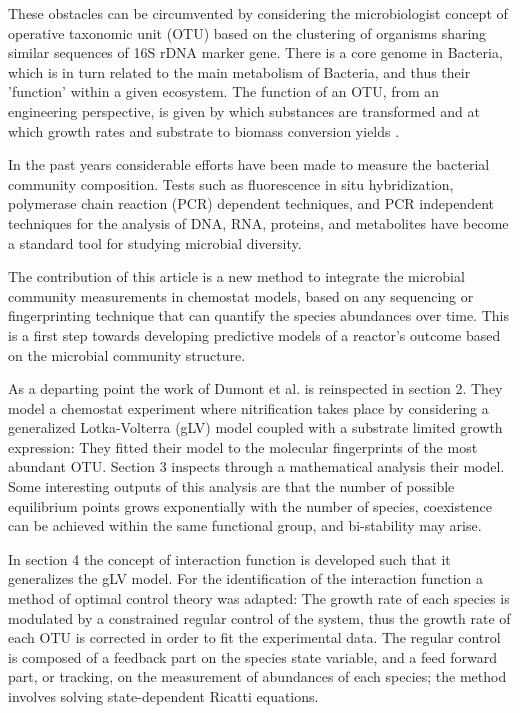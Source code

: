 \documentclass[3p,times]{article}
\begin{document}
These obstacles can be circumvented by considering the microbiologist concept of operative taxonomic unit (OTU) based on the clustering of organisms sharing similar sequences of 16S rDNA marker gene. There is a core genome in Bacteria, which is in turn related to the main metabolism of Bacteria, and thus their 'function' within a given ecosystem. The function of an OTU, from an engineering perspective, is given by which substances are transformed and at which growth rates and substrate to biomass conversion yields \cite{Muyzer1993}.

In the past years considerable efforts have been made to measure the bacterial community composition. Tests such as fluorescence in situ hybridization, polymerase chain reaction (PCR) dependent techniques, and PCR independent techniques for the analysis of DNA, RNA, proteins, and metabolites have become a standard tool for studying  microbial diversity\cite{FERRERA2016790}. 

The contribution of this article is a new method to integrate the microbial community measurements in chemostat models, based on any sequencing or fingerprinting technique that can quantify the species abundances over time. This is a first step towards developing predictive models of a reactor's outcome based on the microbial community structure.

As a departing point the work of Dumont et al.\cite{Dumont2016} is reinspected in section 2. They model a chemostat experiment where nitrification takes place by considering a generalized Lotka-Volterra (gLV) model \cite{Hernandez-Bermejo1997} coupled with a substrate limited growth expression: They fitted their model to the molecular fingerprints of the most abundant OTU. Section 3 inspects through a mathematical analysis their model. Some interesting outputs of this analysis are that the number of possible equilibrium points grows exponentially with the number of species,  coexistence can be achieved within the same functional group, and bi-stability may arise.  

In section 4 the concept of interaction function is developed such that it generalizes the gLV model. For the identification of the interaction function a method of optimal control theory was adapted: The growth rate of each species is modulated by a constrained regular control of the system, thus the growth rate of each OTU is corrected in order to fit the experimental data. The regular control is composed of a feedback part on the species state variable, and a feed forward part, or tracking, on the measurement of abundances of each species; the method involves solving state-dependent Ricatti equations\cite{Cimen2008}. 
\end{document}

